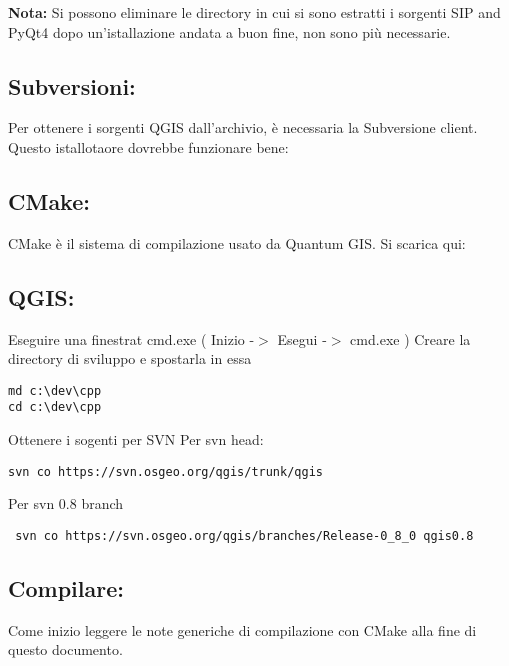 \textbf{Nota:} Si possono eliminare le directory in cui si sono estratti i sorgenti SIP and PyQt4 dopo un'istallazione andata a buon fine, non sono più necessarie.

\subsection{Subversioni:}
Per ottenere i sorgenti QGIS dall'archivio, è necessaria la Subversione
client. Questo istallotaore dovrebbe funzionare bene:


\subsection{CMake:}
CMake è il sistema di compilazione usato da Quantum GIS. Si scarica qui:


\subsection{QGIS:}
Eseguire una finestrat cmd.exe ( Inizio -$>$ Esegui -$>$ cmd.exe ) Creare la directory di sviluppo e spostarla in essa

\begin{verbatim}
md c:\dev\cpp 
cd c:\dev\cpp 
\end{verbatim}

Ottenere i sogenti per SVN 
Per svn head:

\begin{verbatim}
svn co https://svn.osgeo.org/qgis/trunk/qgis 
\end{verbatim}
Per svn 0.8 branch

\begin{verbatim}
 svn co https://svn.osgeo.org/qgis/branches/Release-0_8_0 qgis0.8
\end{verbatim}

\subsection{Compilare:}
Come inizio leggere le note generiche di compilazione con CMake alla fine di questo documento.

